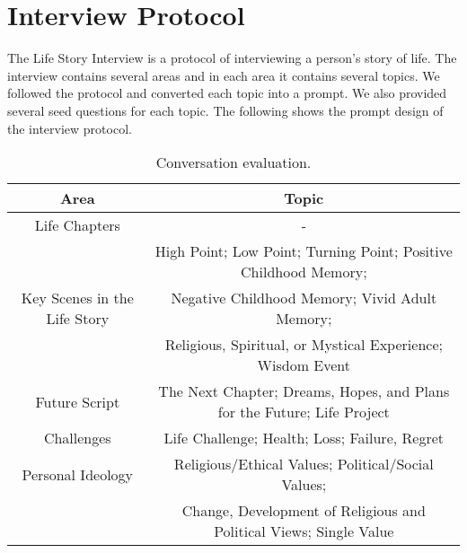 
\clearpage
\appendix
\onecolumn

\section{Interview Protocol}\label{appendix:interview_protocol}
The Life Story Interview\cite{mcadams2008life} is a protocol of interviewing a person's story of life. The interview contains several areas and in each area it contains several topics. We followed the protocol and converted each topic into a prompt. We also provided several seed questions for each topic. The following shows the prompt design of the interview protocol.
\vspace{-3mm}
\begin{table*}[h]
    \centering
    \begin{tabular}{c|c}
        \toprule
        \textbf{Area} & \textbf{Topic} \\
        \toprule
        Life Chapters & - \\
        \midrule
        & High Point; Low Point; Turning Point; Positive Childhood Memory; \\
        Key Scenes in the Life Story & Negative Childhood Memory; Vivid Adult Memory; \\
        & Religious, Spiritual, or Mystical Experience; Wisdom Event\\
        \midrule
        Future Script & The Next Chapter; Dreams, Hopes, and Plans for the Future; Life Project\\
        \midrule
        Challenges & Life Challenge; Health; Loss; Failure, Regret\\
        \midrule
        Personal Ideology & Religious/Ethical Values; Political/Social Values; \\
        & Change, Development of Religious and Political Views; Single Value \\
        \bottomrule
    \end{tabular}
    \vspace{-3mm}
    \caption{Conversation evaluation.}
    \label{tab:autobiography_evaluation}
\end{table*}
\vspace{-2mm}

